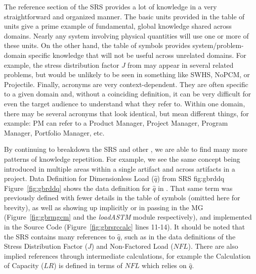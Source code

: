 The reference section of the SRS provides a lot of knowledge in a very 
straightforward and organized manner. The basic units provided in the table of 
units give a prime example of fundamental, global knowledge shared across 
domains. Nearly any system involving physical quantities will use one or more 
of these units. On the other hand, the table of symbols provides 
system/problem-domain specific knowledge that will not be useful across 
unrelated domains. For example, the stress distribution factor $J$ from \gb{} 
may appear in several related problems, but would be unlikely to be seen in 
something like SWHS, NoPCM, or Projectile. Finally, acronyms are very 
context-dependent. They are often specific to a given domain and, without a 
coinciding definition, it can be very difficult for even the target audience to 
understand what they refer to. Within one domain, there may be several acronyms 
that look identical, but mean different things, for example: PM can refer to a 
Product Manager, Project Manager, Program Manager, Portfolio Manager, etc.

By continuing to breakdown the SRS and other \sfs{}, we are able to find many 
more patterns of knowledge repetition. For example, we see the same concept 
being introduced in multiple areas within a single artifact and across 
artifacts in a project.
{Data Definition for Dimensionless Load ($\hat{q}$) from \gb{} SRS}
{fig:gbrddq}
Figure~\ref{fig:gbrddq} shows the data definition for $\hat{q}$ in \gb{}. That 
same term was previously defined with fewer details in the table of symbols 
(omitted here for brevity), as well as showing up implicitly or in passing 
in the MG (Figure~\ref{fig:gbrmgcm} and the \emph{loadASTM} module 
respectively), and implemented in the Source Code (Figure~\ref{fig:gbrsrccalc} 
lines 11-14). It should be noted that the SRS contains many references to 
$\hat{q}$, such as in the data definitions of the Stress Distribution Factor 
($J$) and Non-Factored Load ($NFL$). There are also implied references through 
intermediate calculations, for example the Calculation of Capacity ($LR$) is 
defined in terms of $NFL$ which relies on $\hat{q}$.

